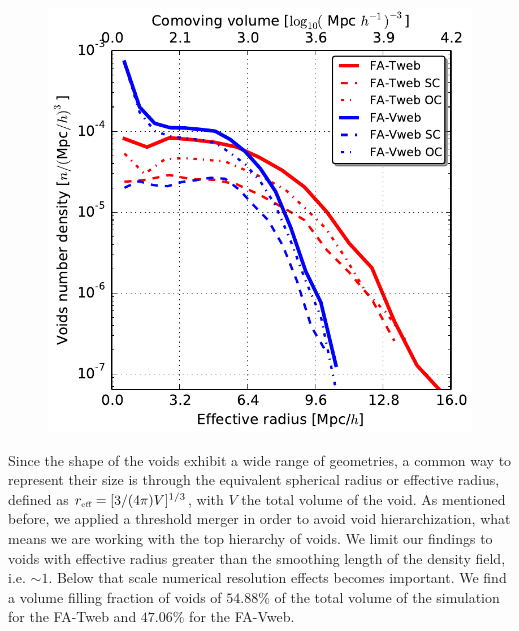 \documentclass[a4,useAMS,usenatbib,usegraphicx]{latex/mn2e}
\begin{document}
\begin{figure}
\centering

  \includegraphics[trim = 0mm 0mm 0mm 0mm, clip, keepaspectratio=true,
  width=0.3\textheight]{./figures/voids_regions_volume_all.pdf}


  \label{fig:volume_function}

\end{figure}


Since the shape of the voids exhibit a wide range of geometries, a common 
way to represent their size is through the equivalent spherical radius or
effective radius, defined as $\reff = [3/(4\pi)V]^{1/3}$, with $V$ the 
total volume of the void. As mentioned before, we applied a threshold merger
in order to avoid void hierarchization, what means we are working with the
top hierarchy of voids. We limit our findings to voids with effective radius
greater than the smoothing length of the density field, i.e. $\sim 1$\hMpc. 
Below that scale numerical resolution effects becomes important. We find a
volume filling fraction of voids of $54.88\%$ of the total volume of the 
simulation for the FA-Tweb and $47.06\%$ for the FA-Vweb.
\end{document}
